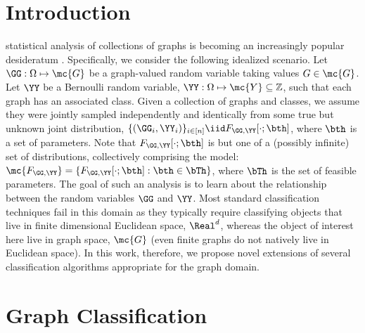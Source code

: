 \documentclass[10pt,journal,cspaper,compsoc]{IEEEtran}
\begin{document}
\maketitle
\IEEEdisplaynotcompsoctitleabstractindextext
\IEEEpeerreviewmaketitle



\section{Introduction}

 statistical analysis of collections of graphs is becoming an increasingly popular desideratum \cite{Bunke2011}.  Specifically, we consider the following idealized scenario. Let $\GG: \Omega \mapsto \mc{G}$ be a graph-valued random variable taking values $G\in \mc{G}$.  Let $\YY$ be a Bernoulli random variable, $\YY: \Omega \mapsto \mc{Y} \subseteq \mathbb{Z}$, such that each graph has an associated class.  Given a collection of graphs and classes,  we assume they were jointly sampled independently and identically from some true but unknown joint distribution, $\{(\GG_i,\YY_i)\}_{i \in [n]} \iid F_{\GG,\YY}[\cdot; \bth]$, where $\bth$ is a set of parameters.  Note that $F_{\GG,\YY}[\cdot; \bth]$ is but one of a (possibly infinite) set of distributions, collectively comprising the model: $\mc{F_{\GG,\YY}}=\{F_{\GG,\YY}[\cdot; \bth] : \bth \in \bTh\}$, where $\bTh$ is the set of feasible parameters.  The goal of such an analysis is to learn about the relationship between the random variables $\GG$ and $\YY$.   Most standard classification techniques fail in this domain as they typically require classifying objects that live in finite dimensional Euclidean space, $\Real^d$, whereas the object of interest here live in graph space, $\mc{G}$ (even finite graphs do not natively live in Euclidean space).  In this work, therefore, we propose novel extensions of several classification algorithms appropriate for the graph domain.



\section{Graph Classification} %
\label{sec:graph_classification}
\end{document}
